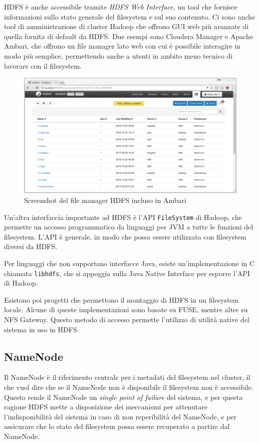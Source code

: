 \documentclass[italian,a4paper, twoside, 12pt]{report}
\begin{document}
HDFS è anche accessibile tramite \emph{HDFS Web Interface}, un tool che
fornisce informazioni sullo stato generale del filesystem e sul suo
contenuto. Ci sono anche tool di amministrazione di cluster Hadoop che
offrono GUI web più avanzate di quella fornita di default da HDFS. Due
esempi sono Cloudera Manager e Apache Ambari, che offrono un file
manager lato web con cui è possibile interagire in modo più semplice,
permettendo anche a utenti in ambito meno tecnico di lavorare con il
filesystem.

\begin{figure}
\centering
\includegraphics{img/ambari_hdfs.png}
\caption{Screenshot del file manager HDFS incluso in Ambari}
\end{figure}

Un'altra interfaccia importante ad HDFS è l'API \texttt{FileSystem} di
Hadoop, che permette un accesso programmatico da linguaggi per JVM a
tutte le funzioni del filesystem. L'API è generale, in modo che possa
essere utilizzata con filesystem diversi da HDFS.

Per linguaggi che non supportano interfacce Java, esiste
un'implementazione in C chiamata \texttt{libhdfs}, che si appoggia sulla
Java Native Interface per esporre l'API di Hadoop.

Esistono poi progetti che permettono il montaggio di HDFS in un
filesystem locale. Alcune di queste implementazioni sono basate su FUSE,
mentre altre su NFS Gateway. Questo metodo di accesso permette
l'utilizzo di utilità native del sistema in uso in HDFS.

\subsection{NameNode}\label{namenode}

Il NameNode è il riferimento centrale per i metadati del filesystem nel
cluster, il che vuol dire che se il NameNode non è disponibile il
filesystem non è accessibile. Questo rende il NameNode un \emph{single
point of failure} del sistema, e per questa ragione HDFS mette a
disposizione dei meccanismi per attenutare l'indisponibilità del sistema
in caso di non reperibilità del NameNode, e per assicurare che lo stato
del filesystem possa essere recuperato a partire dal NameNode.
\end{document}
